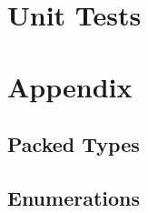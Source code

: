 

\section{Unit Tests}



\section{Appendix}
\subsection{Packed Types}



\subsection{Enumerations}




